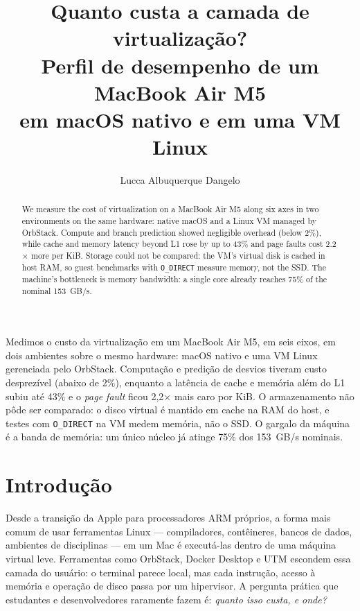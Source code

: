 \documentclass[12pt]{article}
\title{Quanto custa a camada de virtualização?\\
Perfil de desempenho de um MacBook Air M5\\
em macOS nativo e em uma VM Linux}
\author{Lucca Albuquerque Dangelo\inst{1}}
\begin{document}
\maketitle

\begin{abstract}
  We measure the cost of virtualization on a MacBook Air M5 along six axes in two environments on the
  same hardware: native macOS and a Linux VM managed by OrbStack. Compute and
  branch prediction showed negligible overhead (below 2\%), while cache and
  memory latency beyond L1 rose by up to 43\% and page faults cost 2.2$\times$ more
  per KiB. Storage could not be compared: the VM's virtual disk is cached
  in host RAM, so guest benchmarks with \texttt{O\_DIRECT} measure memory, not
  the SSD. The machine's bottleneck is memory bandwidth: a single core already
  reaches 75\% of the nominal 153~GB/s.
\end{abstract}

\begin{resumo}
  Medimos o custo da virtualização em um MacBook Air M5,
  em seis eixos, em dois ambientes sobre o mesmo hardware: macOS nativo e uma VM Linux
  gerenciada pelo OrbStack. Computação e predição de desvios tiveram custo
  desprezível (abaixo de 2\%), enquanto a latência de cache e memória além do L1
  subiu até 43\% e o \emph{page fault} ficou 2,2$\times$ mais caro por KiB. O armazenamento não pôde ser comparado: o disco virtual é mantido em
  cache na RAM do host, e testes com \texttt{O\_DIRECT} na VM medem memória, não
  o SSD. O gargalo da máquina é a banda de memória: um único núcleo já atinge
  75\% dos 153~GB/s nominais.
\end{resumo}

\section{Introdução}

Desde a transição da Apple para processadores ARM próprios, a forma mais comum
de usar ferramentas Linux --- compiladores, contêineres, bancos de dados,
ambientes de disciplinas --- em um Mac é executá-las dentro de uma máquina
virtual leve. Ferramentas como OrbStack, Docker Desktop e UTM escondem essa
camada do usuário: o terminal parece local, mas cada instrução, acesso à memória
e operação de disco passa por um hipervisor. A pergunta prática que
estudantes e desenvolvedores raramente fazem é: \emph{quanto isso custa, e
onde?}
\end{document}
